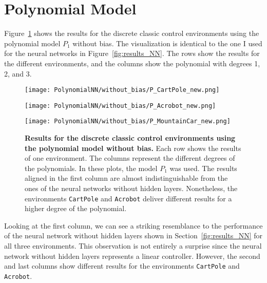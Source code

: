 \section{Polynomial Model}
Figure~\ref{fig:results_Polynomial} shows the results for the discrete classic control environments using the polynomial model $P_1$ without bias. The visualization is identical to the one I used for the neural networks in Figure~\ref{fig:results_NN}. The rows show the results for the different environments, and the columns show the polynomial with degrees 1, 2, and 3.
\begin{figure}[!ht]
  \centering
  \texttt{[image: PolynomialNN/without\_bias/P\_CartPole\_new.png]}

      \vspace{0.2cm}

  \texttt{[image: PolynomialNN/without\_bias/P\_Acrobot\_new.png]}

      \vspace{0.2cm}

  \texttt{[image: PolynomialNN/without\_bias/P\_MountainCar\_new.png]}
\caption[Results for the discrete classic control environments using the polynomial model without bias]{
  \textbf{Results for the discrete classic control environments using the polynomial model without bias.}
   Each row shows the results of one environment. The columns represent the different degrees of the polynomials. In these plots, the model $P_1$ was used. The results aligned in the first column are almost indistinguishable from the ones of the neural networks without hidden layers. Nonetheless, the environments \texttt{CartPole} and \texttt{Acrobot} deliver different results for a higher degree of the polynomial.
}
\label{fig:results_Polynomial}
\end{figure}
Looking at the first column, we can see a striking resemblance to the performance of the neural network without hidden layers shown in Section~\ref{fig:results_NN} for all three environments. This observation is not entirely a surprise since the neural network without hidden layers represents a linear controller. However, the second and last columns show different results for the environments \verb|CartPole| and \verb|Acrobot|.

